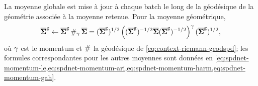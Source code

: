 
\begin{property}
\label{prop:spdnet-momentum}
  La moyenne globale est mise à jour à chaque batch le long de la géodésique de
  la géométrie associée à la moyenne retenue. Pour la moyenne géométrique,
  \begin{equation}
    \overline{\boldsymbol{\Sigma}}^{\mathrm{g}}
    \gets
    \overline{\boldsymbol{\Sigma}}^{\mathrm{g}}\,\#_{\gamma}\,\overline{\boldsymbol{\Sigma}}
    =
    (\overline{\boldsymbol{\Sigma}}^{\mathrm{g}})^{1/2}\left((\overline{\boldsymbol{\Sigma}}^{\mathrm{g}})^{-1/2}\overline{\boldsymbol{\Sigma}}(\overline{\boldsymbol{\Sigma}}^{\mathrm{g}})^{-1/2}\right)^{\gamma}(\overline{\boldsymbol{\Sigma}}^{\mathrm{g}})^{1/2},
    \label{eq:spdnet-momentum-geo}
  \end{equation}
  où $\gamma$ est le momentum et $\#$ la géodésique de
  \cref{eq:context-riemann-geodspd}; les formules correspondantes pour les
  autres moyennes sont données en
  \cref{eq:spdnet-momentum-le,eq:spdnet-momentum-ari,eq:spdnet-momentum-harm,eq:spdnet-momentum-gah}.
\end{property}


